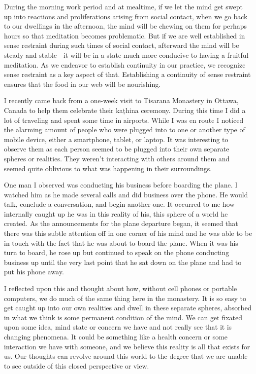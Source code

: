 During the morning work period and at mealtime, if we let the mind get 
swept up into reactions and proliferations arising from social contact, 
when we go back to our dwellings in the afternoon, the mind will be 
chewing on them for perhaps hours so that meditation becomes 
problematic. But if we are well established in sense restraint during 
such times of social contact, afterward the mind will be steady and 
stable---it will be in a state much more conducive to having a fruitful 
meditation. As we endeavor to establish continuity in our practice, we 
recognize sense restraint as a key aspect of that. Establishing a 
continuity of sense restraint ensures that the food in our web will be 
nourishing.


I recently came back from a one-week visit to Tisarana Monastery in 
Ottawa, Canada to help them celebrate their kaṭhina ceremony. During 
this time I did a lot of traveling and spent some time in airports. 
While I was en route I noticed the alarming amount of people who were 
plugged into to one or another type of mobile device, either a 
smartphone, tablet, or laptop. It was interesting to observe them as 
each person seemed to be plugged into their own separate spheres or 
realities. They weren't interacting with others around them and seemed 
quite oblivious to what was happening in their surroundings.

One man I observed was conducting his business before boarding the 
plane. I watched him as he made several calls and did business over the 
phone. He would talk, conclude a conversation, and begin another one. 
It occurred to me how internally caught up he was in this reality of 
his, this sphere of a world he created. As the announcements for the 
plane departure began, it seemed that there was this subtle attention 
off in one corner of his mind and he was able to be in touch with the 
fact that he was about to board the plane. When it was his turn to 
board, he rose up but continued to speak on the phone conducting 
business up until the very last point that he sat down on the plane and 
had to put his phone away.

I reflected upon this and thought about how, without cell phones or 
portable computers, we do much of the same thing here in the monastery. 
It is so easy to get caught up into our own realities and dwell in 
these separate spheres, absorbed in what we think is some permanent 
condition of the mind. We can get fixated upon some idea, mind state or 
concern we have and not really see that it is changing phenomena. It 
could be something like a health concern or some interaction we have 
with someone, and we believe this reality is all that exists for us. 
Our thoughts can revolve around this world to the degree that we are 
unable to see outside of this closed perspective or view.

